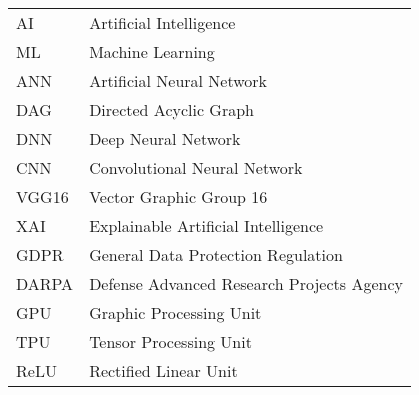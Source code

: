 %
%
%
%

\begin{acronyms}

\renewcommand{\arraystretch}{1.5}
\setlength{\tabcolsep}{3mm}
{\begin {tabular}{ll}

AI  &    Artificial Intelligence    \\
ML  &   Machine Learning    \\
ANN &   Artificial Neural Network   \\
DAG &   Directed Acyclic Graph  \\
DNN &   Deep Neural Network \\
CNN &   Convolutional Neural Network    \\
VGG16   &   Vector Graphic Group 16 \\
XAI &   Explainable Artificial Intelligence \\
GDPR    &   General Data Protection Regulation  \\
DARPA   &   Defense Advanced Research Projects Agency   \\
GPU &   Graphic Processing Unit \\
TPU &   Tensor Processing Unit  \\
ReLU    &   Rectified Linear Unit   \\

\end {tabular}}

\end{acronyms}
